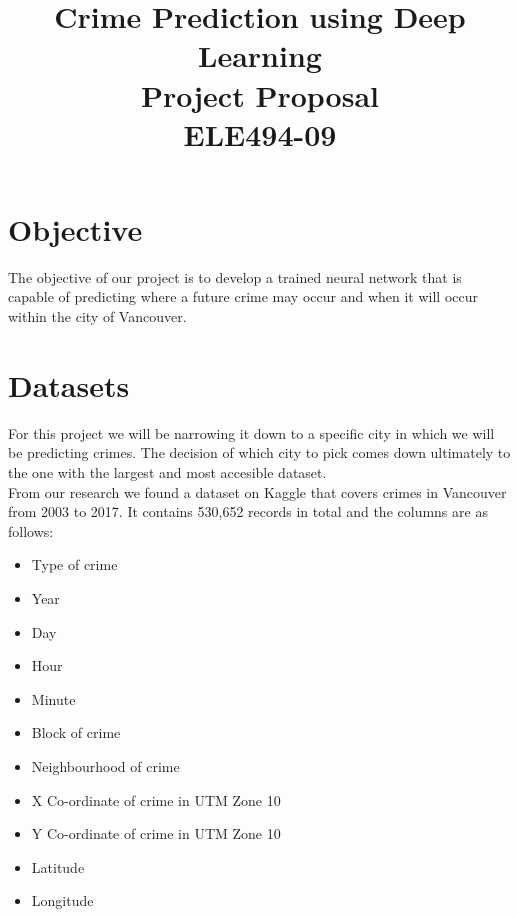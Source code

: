 \documentclass[conference]{IEEEtran}
\begin{document}
 
    \title{
        Crime Prediction using Deep Learning\\[0.3cm]
        \large Project Proposal\\
        ELE494-09
    }

    \author{
        \and
    }

    \maketitle

    \section{Objective}

    The objective of our project is to develop a trained neural network
    that is capable of predicting where a future crime may occur and when it will occur within the city of Vancouver.
    \section{Datasets}

    For this project we will be narrowing it down to a specific city in which
    we will be predicting crimes. The decision of which city to pick comes down ultimately to
    the one with the largest and most accesible dataset.\\

    From our research we found a dataset on Kaggle that covers crimes in Vancouver from
    2003 to 2017. It contains 530,652 records in total and the columns are as follows:

    \begin{itemize}
        \item Type of crime
        \item Year
        \item Day
        \item Hour
        \item Minute
        \item Block of crime
        \item Neighbourhood of crime
        \item X Co-ordinate of crime in UTM Zone 10
        \item Y Co-ordinate of crime in UTM Zone 10
        \item Latitude
        \item Longitude\\
    \end{itemize}
    
\end{document}

